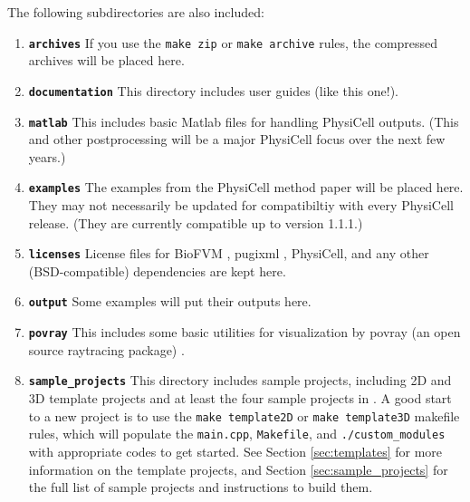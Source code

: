 \documentclass[12pt]{article}
\renewcommand{\v}{\verb}
\newcommand{\smallcode}[1]{\textbf{\texttt{#1}}}
\begin{document}
The following subdirectories are also included: 
\begin{enumerate}
\item 
\smallcode{archives} If you use the \v|make zip| or \v|make archive| rules, the compressed archives will be placed here.  
\item 
\smallcode{documentation} This directory includes user guides (like this one!). 
\item 
\smallcode{matlab} This includes basic Matlab files for handling PhysiCell outputs. (This and other postprocessing 
will be a major PhysiCell focus over the next few years.) 
\item
\smallcode{examples} The examples from the PhysiCell method paper will be placed here. They may not 
necessarily be updated for compatibiltiy with every PhysiCell release. (They are currently compatible up to version 
1.1.1.) 
\item 
\smallcode{licenses} License files for BioFVM \cite{ref:BioFVM}, pugixml \cite{ref:pugixml}, PhysiCell, 
and any other (BSD-compatible) dependencies are kept here. 
\item 
\smallcode{output} Some examples will put their outputs here. 
\item 
\smallcode{povray} This includes some basic utilities for visualization by povray (an open source raytracing package) \cite{ref:povray}. 
\item 
\smallcode{sample\_projects} This directory includes sample projects, including 2D and 3D template projects 
and at least the four sample projects in \cite{ref:PhysiCell}.  A good start to a new 
project is to use the \v|make template2D| or \v|make template3D| makefile rules, 
which will populate the \v|main.cpp|, \v|Makefile|, and \v|./custom_modules| with appropriate 
codes to get started. See Section \ref{sec:templates} for more information on the 
template projects, and Section \ref{sec:sample_projects} for the full list of sample 
projects and instructions to build them. 



\end{enumerate}
\end{document}
